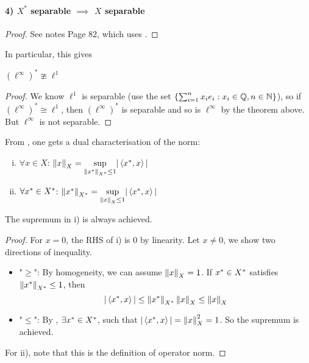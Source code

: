 \documentclass{article}
\begin{document}
\paragraph{4) $X^*$ separable $\implies$ $X$ separable}  
\begin{proof}
    See notes Page 82, which uses .
\end{proof}

In particular, this gives  

\begin{corollary}
    $(\ell^{\infty})^* \ncong \ell^1$
\end{corollary}
\begin{proof}
    We know $\ell^1$ is separable (use the set $\{\sum_{i=1}^n x_i e_i: x_i \in \mathbb{Q}, n \in \mathbb{N}\}$), so if $(\ell^{\infty})^* \cong \ell^1$, then $(\ell^{\infty})^*$ is separable and so is $\ell^{\infty}$ by the theorem above. But $\ell^{\infty}$ is not separable.
\end{proof} 

From , one gets a dual characterisation of the norm:  

\begin{corollary}
\phantom{something}
\label{duality of norm}
\label{dual characterisation of norm}
\begin{enumerate}[i)]
    \item $\forall x \in X$: $\left\|{x}\right\|_X = \underset{{\left\|{x^*}\right\|_{{X}^*} \leq 1}}{\sup} |\left<{{x}^*},{x}\right>|$
    \item $\forall {x}^* \in {X}^*$: $\left\|{{x}^*}\right\|_{{X}^*} = \underset{{\left\|{x}\right\|_X \leq 1}}{\sup} |\left<{{x}^*},{x}\right>|$
\end{enumerate}
The supremum in i) is always achieved.  
\end{corollary}


\begin{proof}
For $x=0$, the RHS of i) is $0$ by linearity. Let $x \neq 0$, we show two directions of inequality.  
\begin{itemize}
    \item "$\geq$": By homogeneity, we can assume $\left\|{x}\right\|_X=1$. If ${x}^* \in {X}^*$ satisfies $\left\|{x^*}\right\|_{{X}^*} \leq 1$, then  
    $$|\left<{{x}^*},{x}\right>| \leq \left\|{x^*}\right\|_{{X}^*} \left\|{x}\right\|_X \leq \left\|{x}\right\|_X$$
    \item "$\leq$": By , $\exists {x}^* \in {X}^*$, such that $|\left<{{x}^*},{x}\right>|=\left\|{x}\right\|_X^2=1$. So the supremum is achieved.
\end{itemize}   

For ii), note that this is the definition of operator norm.   
\end{proof}
\end{document}
